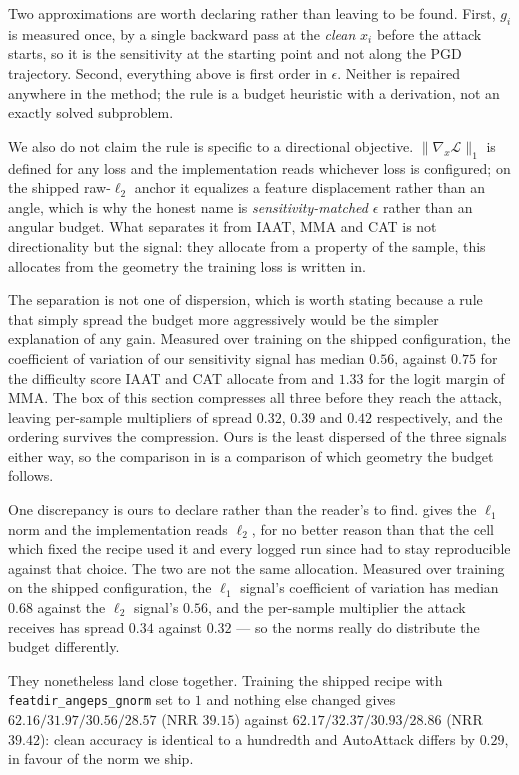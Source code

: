 \documentclass{article} %
\theoremstyle{plain}
\begin{document}
Two approximations are worth declaring rather than leaving to be found. First, $g_i$ is measured once,
by a single backward pass at the \emph{clean} $x_i$ before the attack starts, so it is the sensitivity
at the starting point and not along the PGD trajectory. Second, everything above is first order in
$\epsilon$. Neither is repaired anywhere in the method; the rule is a budget heuristic with a
derivation, not an exactly solved subproblem.

We also do not claim the rule is specific to a directional objective. $\lVert\nabla_x\mathcal{L}\rVert_1$
is defined for any loss and the implementation reads whichever loss is configured; on the shipped
raw-$\ell_2$ anchor it equalizes a feature displacement rather than an angle, which is why the honest
name is \emph{sensitivity-matched} $\epsilon$ rather than an angular budget. What separates it from
IAAT, MMA and CAT is not directionality but the signal: they allocate from a property of the sample,
this allocates from the geometry the training loss is written in.

The separation is not one of dispersion, which is worth stating because a rule that simply spread the
budget more aggressively would be the simpler explanation of any gain. Measured over training on the
shipped configuration, the coefficient of variation of our sensitivity signal has median $0.56$,
against $0.75$ for the difficulty score IAAT and CAT allocate from and $1.33$ for the logit margin of
MMA. The box of this section compresses all three before they reach the attack, leaving per-sample
multipliers of spread $0.32$, $0.39$ and $0.42$ respectively, and the ordering survives the
compression. Ours is the least dispersed of the three signals either way, so the comparison in
 is a comparison of which geometry the budget follows.

One discrepancy is ours to declare rather than the reader's to find.  gives the
$\ell_1$ norm and the implementation reads $\ell_2$, for no better reason than that the cell which
fixed the recipe used it and every logged run since had to stay reproducible against that choice. The
two are not the same allocation.
Measured over training on the shipped configuration, the $\ell_1$ signal's coefficient of variation
has median $0.68$ against the $\ell_2$ signal's $0.56$, and the per-sample multiplier the attack
receives has spread $0.34$ against $0.32$ --- so the norms really do distribute the budget
differently.

They nonetheless land close together. Training the shipped recipe with
\texttt{featdir\_angeps\_gnorm} set to $1$ and nothing else changed gives $62.16 / 31.97 / 30.56 /
28.57$ (NRR $39.15$) against $62.17 / 32.37 / 30.93 / 28.86$ (NRR $39.42$): clean accuracy is
identical to a hundredth and AutoAttack differs by $0.29$, in favour of the norm we ship.
\end{document}

